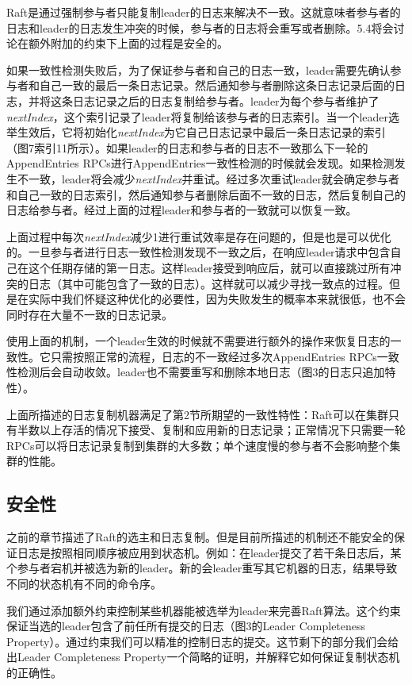 \documentclass[journal]{IEEEtran}
\begin{document}
Raft是通过强制参与者只能复制leader的日志来解决不一致。这就意味者参与者的日志和leader的日志发生冲突的时候，参与者的日志将会重写或者删除。5.4将会讨论在额外附加的约束下上面的过程是安全的。

如果一致性检测失败后，为了保证参与者和自己的日志一致，leader需要先确认参与者和自己一致的最后一条日志记录。然后通知参与者删除这条日志记录后面的日志，并将这条日志记录之后的日志复制给参与者。leader为每个参与者维护了\textit{nextIndex}，这个索引记录了leader将复制给该参与者的日志索引。当一个leader选举生效后，它将初始化\textit{nextIndex}为它自己日志记录中最后一条日志记录的索引（图7索引11所示）。如果leader的日志和参与者的日志不一致那么下一轮的AppendEntries RPCs进行AppendEntries一致性检测的时候就会发现。如果检测发生不一致，leader将会减少\textit{nextIndex}并重试。经过多次重试leader就会确定参与者和自己一致的日志索引，然后通知参与者删除后面不一致的日志，然后复制自己的日志给参与者。经过上面的过程leader和参与者的一致就可以恢复一致。

上面过程中每次\textit{nextIndex}减少1进行重试效率是存在问题的，但是也是可以优化的。一旦参与者进行日志一致性检测发现不一致之后，在响应leader请求中包含自己在这个任期存储的第一日志。这样leader接受到响应后，就可以直接跳过所有冲突的日志（其中可能包含了一致的日志）。这样就可以减少寻找一致点的过程。但是在实际中我们怀疑这种优化的必要性，因为失败发生的概率本来就很低，也不会同时存在大量不一致的日志记录。

使用上面的机制，一个leader生效的时候就不需要进行额外的操作来恢复日志的一致性。它只需按照正常的流程，日志的不一致经过多次AppendEntries RPCs一致性检测后会自动收敛。leader也不需要重写和删除本地日志（图3的日志只追加特性）。

上面所描述的日志复制机器满足了第2节所期望的一致性特性：Raft可以在集群只有半数以上存活的情况下接受、复制和应用新的日志记录；正常情况下只需要一轮RPCs可以将日志记录复制到集群的大多数；单个速度慢的参与者不会影响整个集群的性能。

\subsection{安全性}
之前的章节描述了Raft的选主和日志复制。但是目前所描述的机制还不能安全的保证日志是按照相同顺序被应用到状态机。例如：在leader提交了若干条日志后，某个参与者宕机并被选为新的leader。新的会leader重写其它机器的日志，结果导致不同的状态机有不同的命令序。

我们通过添加额外约束控制某些机器能被选举为leader来完善Raft算法。这个约束保证当选的leader包含了前任所有提交的日志（图3的Leader Completeness Property）。通过约束我们可以精准的控制日志的提交。这节剩下的部分我们会给出Leader Completeness Property一个简略的证明，并解释它如何保证复制状态机的正确性。
\end{document}
